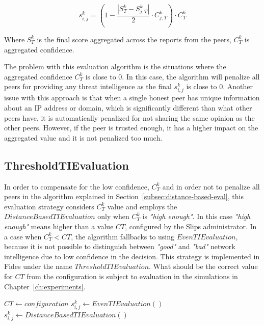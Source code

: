 \begin{equation}
s^{k}_{i, j} = \left(1 - \frac{|{S}^{k}_{T} - S^{k}_{j, T}|}{2} \cdot C^{k}_{j, T}\right) \cdot C^{k}_{T}
\end{equation}

Where $S^{k}_{T}$ is the final score aggregated across the reports from the peers, $C^{k}_{T}$ is aggregated confidence.

The problem with this evaluation algorithm is the situations where the aggregated confidence $C^{k}_{T}$ is close to $0$. In this case, the algorithm will penalize all peers for providing any threat intelligence as the final $s^{k}_{i, j}$ is close to $0$. Another issue with this approach is that when a single honest peer has unique information about an IP address or domain, which is significantly different than what other peers have, it is automatically penalized for not sharing the same opinion as the other peers. However, if the peer is trusted enough, it has a higher impact on the aggregated value and it is not penalized too much.

\subsection{ThresholdTIEvaluation}
\label{subsec:network-intelligence-conf-high-enough}
In order to compensate for the low confidence, $C^{k}_{T}$ and in order not to penalize all peers in the algorithm explained in Section~\ref{subsec:distance-based-eval}, this evaluation strategy considers $C^{k}_{T}$ value and employs the $DistanceBasedTIEvaluation$ only when $C^{k}_{T}$ is \textit{"high enough"}. In this case \textit{"high enough"} means higher than a value ${CT}$, configured by the Slips administrator.
In a case when  $C^{k}_{T} < {CT}$, the algorithm fallbacks to using $EvenTIEvaluation$, because it is not possible to distinguish between \textit{"good"} and \textit{"bad"} network intelligence due to low confidence in the decision. 
This strategy is implemented in Fides under the name $ThresholdTIEvaluation$.
What should be the correct value for $CT$ from the configuration is subject to evaluation in the simulations in Chapter~\ref{ch:experiments}.

\begin{algorithm}
\caption{$ThresholdTIEvaluation$}\label{alg:threshold-ti-evaluation}
\begin{algorithmic}[1]
\State ${CT} \gets configuration$ 
	\State $s^{k}_{i, j} \gets EvenTIEvaluation()$
\Else
    \State $s^{k}_{i, j} \gets DistanceBasedTIEvaluation()$
\EndIf
\end{algorithmic}
\end{algorithm}

